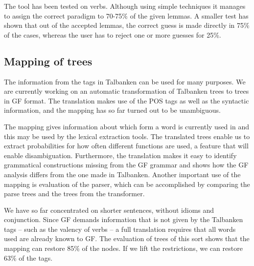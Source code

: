\documentclass[submission]{eptcs} %
\begin{document}
The tool has been tested on verbs. Although using simple techniques it 
manages to assign the correct paradigm to 70-75\% of the given lemmas.
A smaller test has shown that out of the accepted lemmas, the correct guess is
made directly in 75\% of the cases, whereas the user has to reject one or more
guesses for 25\%. 



\subsection{Mapping of trees}
The information from the tags in Talbanken can be used for many purposes.
We are currently working on an automatic transformation of Talbanken trees 
to trees in GF format. The translation makes use of the POS tags as well as
the syntactic information, and the mapping has so far turned out to be unambiguous. 

The mapping gives information about which form a word is
currently used in and this may be used by the lexical extraction
tools. %
The translated trees enable us to extract probabilities for how often
different functions are used, a feature that will enable disambiguation.
Furthermore, the translation makes it easy to identify grammatical constructions
missing from the GF grammar and shows how the GF analysis differs from the one made
in Talbanken.
Another important use of the mapping is evaluation of the parser, which can be
accomplished by comparing the parse trees and the trees from the transformer.

We have so far concentrated on shorter sentences, without idioms and
conjunction. 
Since GF demands information 
that is not given by the Talbanken tags -- such as the valency of verbs -- a
full translation requires that all words used are already known to GF. 
The evaluation of trees of this sort shows that the mapping
can restore 85\% of the nodes. 
If we lift the restrictions, we can restore 63\% of the tags.
\end{document}
